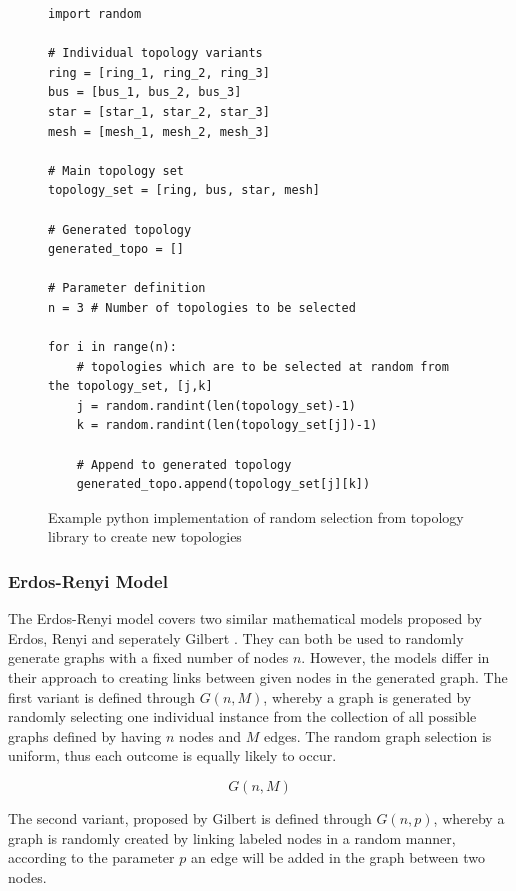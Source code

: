 \begin{figure}
    \centering
    \begin{lstlisting}
import random 

# Individual topology variants
ring = [ring_1, ring_2, ring_3]
bus = [bus_1, bus_2, bus_3]
star = [star_1, star_2, star_3]
mesh = [mesh_1, mesh_2, mesh_3]

# Main topology set
topology_set = [ring, bus, star, mesh]

# Generated topology
generated_topo = []

# Parameter definition
n = 3 # Number of topologies to be selected

for i in range(n):
    # topologies which are to be selected at random from the topology_set, [j,k]
    j = random.randint(len(topology_set)-1)
    k = random.randint(len(topology_set[j])-1)

    # Append to generated topology 
    generated_topo.append(topology_set[j][k])

\end{lstlisting}
    \caption{Example python implementation of random selection from topology library to create new topologies}
    \label{fig:topology_library}
\end{figure}

\subsubsection{Erdos-Renyi Model}
The Erdos-Renyi model \cite{Erdos_renyi_origin} covers two similar mathematical models proposed by Erdos, Renyi and seperately Gilbert \cite{gilbert_background}. They can both be used to randomly generate graphs with a fixed number of nodes $n$. However, the models differ in their approach to creating links between given nodes in the generated graph. The first variant is defined through $G(n,M)$, whereby a graph is generated by randomly selecting one individual instance from the collection of all possible graphs defined by having $n$ nodes and $M$ edges. The random graph selection is uniform, thus each outcome is equally likely to occur. 

\begin{equation}
    G(n,M)
\end{equation}

The second variant, proposed by Gilbert is defined through $G(n,p)$, whereby a graph is randomly created by linking labeled nodes in a random manner, according to the parameter $p$ an edge will be added in the graph between two nodes. 

